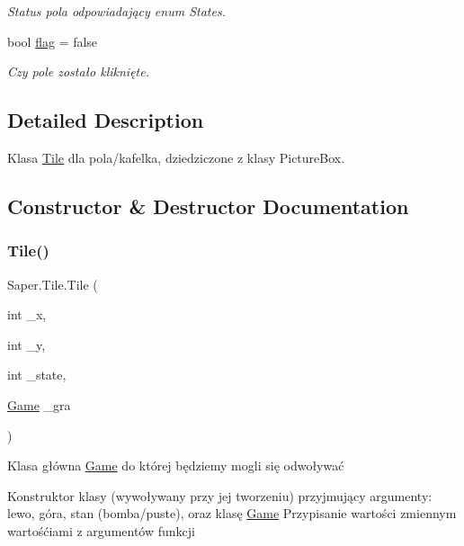\begin{DoxyCompactItemize}
\begin{DoxyCompactList}\small\item\em Status pola odpowiadający enum States. \end{DoxyCompactList}\item 
\mbox{\label{class_saper_1_1_tile_a558d8534615ae6ddcbdbef636b0b7d16}} 
bool \mbox{\hyperlink{class_saper_1_1_tile_a558d8534615ae6ddcbdbef636b0b7d16}{flag}} = false
\begin{DoxyCompactList}\small\item\em Czy pole zostało kliknięte. \end{DoxyCompactList}\end{DoxyCompactItemize}


\subsection{Detailed Description}
Klasa \mbox{\hyperlink{class_saper_1_1_tile}{Tile}} dla pola/kafelka, dziedziczone z klasy Picture\+Box. 

\subsection{Constructor \& Destructor Documentation}
\mbox{\label{class_saper_1_1_tile_a5225a6086870b9c2c9cad42ae248be68}} 
\subsubsection{\texorpdfstring{Tile()}{Tile()}}
{\footnotesize\ttfamily Saper.\+Tile.\+Tile (\begin{DoxyParamCaption}\item[{int}]{\+\_\+x,  }\item[{int}]{\+\_\+y,  }\item[{int}]{\+\_\+state,  }\item[{\mbox{\hyperlink{class_saper_1_1_game}{Game}}}]{\+\_\+gra }\end{DoxyParamCaption})}



Klasa główna \mbox{\hyperlink{class_saper_1_1_game}{Game}} do której będziemy mogli się odwoływać 

Konstruktor klasy (wywoływany przy jej tworzeniu) przyjmujący argumenty\+: lewo, góra, stan (bomba/puste), oraz klasę \mbox{\hyperlink{class_saper_1_1_game}{Game}} Przypisanie wartości zmiennym wartośćiami z argumentów funkcji

